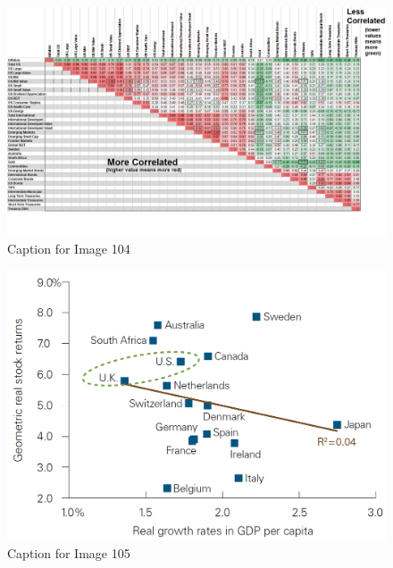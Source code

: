 \documentclass{article}
\begin{document}
\begin{figure}[!htb]
    \centering
    \includegraphics[width=\textwidth]{imgs/104.png}
    \caption{Caption for Image 104}
\end{figure}

\vspace{10pt}

\begin{figure}[!htb]
    \centering
    \includegraphics[width=\textwidth]{imgs/105.png}
    \caption{Caption for Image 105}
\end{figure}

\vspace{10pt}
\end{document}
